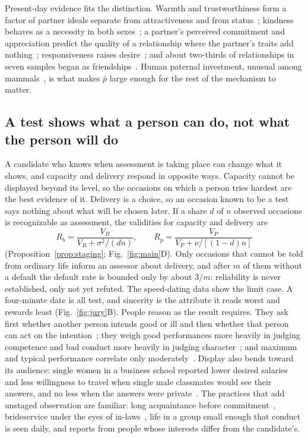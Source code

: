 Present-day evidence fits the distinction. Warmth and trustworthiness form a factor of partner ideals separate from
attractiveness and from status~\cite{fletcher1999}; kindness behaves as a necessity in both sexes~\cite{li2002}; a partner's
perceived commitment and appreciation predict the quality of a relationship where the partner's traits add
nothing~\cite{joel2020}; responsiveness raises desire~\cite{birnbaum2016}; and about two-thirds of relationships in seven
samples began as friendships~\cite{stinson2022}. Human paternal investment, unusual among
mammals~\cite{geary2000,marlowe2000}, is what makes $\bar p$ large enough for the rest of the mechanism to matter.

\subsection{A test shows what a person can do, not what the person will do}\label{sec:resverify}

A candidate who knows when assessment is taking place can change what it shows, and capacity and delivery respond in
opposite ways. Capacity cannot be displayed beyond its level, so the occasions on which a person tries hardest are the best
evidence of it. Delivery is a choice, so an occasion known to be a test says nothing about what will be chosen later. If a
share $d$ of $n$ observed occasions is recognizable as assessment, the validities for capacity and delivery are
\begin{equation}
R_b=\frac{V_B}{V_B+\sigma^2/(dn)},\qquad R_p=\frac{V_P}{V_P+\nu/[(1-d)n]}\label{eq:mainstaging}
\end{equation}
(Proposition~\ref{prop:staging}; Fig.~\ref{fig:main}D). Only occasions that cannot be told from ordinary life inform an
assessor about delivery, and after $m$ of them without a default the default rate is bounded only by about $3/m$:
reliability is never established, only not yet refuted. The speed-dating data show the limit case. A four-minute date is
all test, and sincerity is the attribute it reads worst and rewards least (Fig.~\ref{fig:jury}B). People reason as the
result requires. They ask first whether another person intends good or ill and then whether that person can act on the
intention~\cite{fiske2007}; they weigh good performances more heavily in judging competence and bad conduct more heavily in
judging character~\cite{reeder1979,wojciszke1993}; and maximum and typical performance correlate only
moderately~\cite{beus2012}. Display also bends toward its audience: single women in a business school reported lower
desired salaries and less willingness to travel when single male classmates would see their answers, and no less when the
answers were private~\cite{bursztyn2017}. The practices that add unstaged observation are familiar: long acquaintance
before commitment~\cite{wachtmeister1999,seymour2009,stinson2022}, brideservice under the eyes of
in-laws~\cite{walker2011}, life in a group small enough that conduct is seen daily, and reports from people whose
interests differ from the candidate's.

